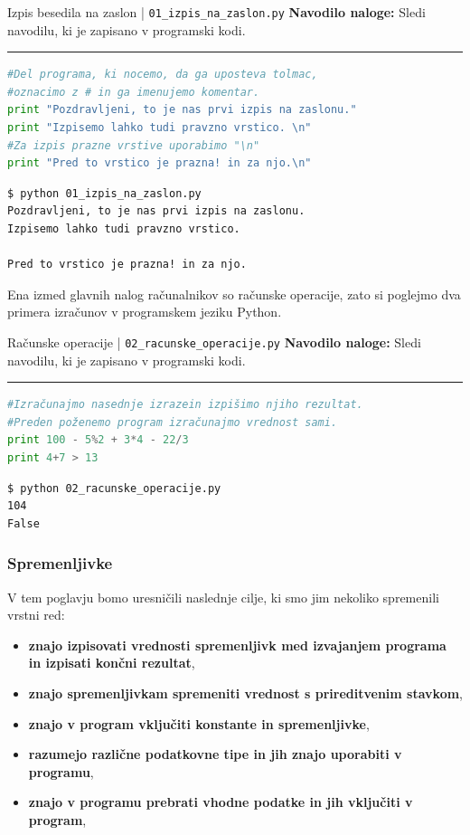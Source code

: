 \begin{examplebox}[label={prog:izpis}]{Izpis besedila na zaslon |
    \texttt{01\_izpis\_na\_zaslon.py} \cite{web:PTHardWay}}
  \textbf{Navodilo naloge:} Sledi navodilu, ki je zapisano v programski
  kodi.
\rule{\textwidth}{.4pt}
\begin{lstlisting}[language=Python]
#Del programa, ki nocemo, da ga uposteva tolmac,
#oznacimo z # in ga imenujemo komentar.
print "Pozdravljeni, to je nas prvi izpis na zaslonu."
print "Izpisemo lahko tudi pravzno vrstico. \n"
#Za izpis prazne vrstive uporabimo "\n"
print "Pred to vrstico je prazna! in za njo.\n"
\end{lstlisting}
\tcblower
\begin{Verbatim}[fontsize=\footnotesize]
$ python 01_izpis_na_zaslon.py
Pozdravljeni, to je nas prvi izpis na zaslonu.
Izpisemo lahko tudi pravzno vrstico.

Pred to vrstico je prazna! in za njo.
\end{Verbatim}
\end{examplebox}

Ena izmed glavnih nalog računalnikov so računske operacije, zato si
poglejmo dva primera izračunov v programskem jeziku Python.

\begin{examplebox}[label={prog:racunske_operacije}]{Računske operacije |
    \texttt{02\_racunske\_operacije.py} \cite{web:PTHardWay}}
  \textbf{Navodilo naloge:} Sledi navodilu, ki je zapisano v programski
  kodi.
\rule{\textwidth}{.4pt}
\begin{lstlisting}[language=Python]
#Izračunajmo nasednje izrazein izpišimo njiho rezultat.
#Preden poženemo program izračunajmo vrednost sami.
print 100 - 5%2 + 3*4 - 22/3
print 4+7 > 13
\end{lstlisting}
\tcblower
\begin{Verbatim}[fontsize=\footnotesize]
$ python 02_racunske_operacije.py
104
False
\end{Verbatim}
\end{examplebox}

\subsubsection{Spremenljivke}
\label{sec:spremenljivke}

V tem poglavju bomo uresničili naslednje cilje, ki smo jim nekoliko
spremenili vrstni red:
\begin{itemize}
\tightlist
\item \textbf{znajo izpisovati vrednosti spremenljivk med izvajanjem programa
  in izpisati končni rezultat},
\item \textbf{znajo spremenljivkam spremeniti vrednost s prireditvenim
  stavkom},
\item \textbf{znajo v program vključiti konstante in spremenljivke},
\item \textbf{ razumejo različne podatkovne tipe in jih znajo uporabiti v
  programu},
\item \textbf{znajo v programu prebrati vhodne podatke in jih vključiti v
  program},
\end{itemize}


